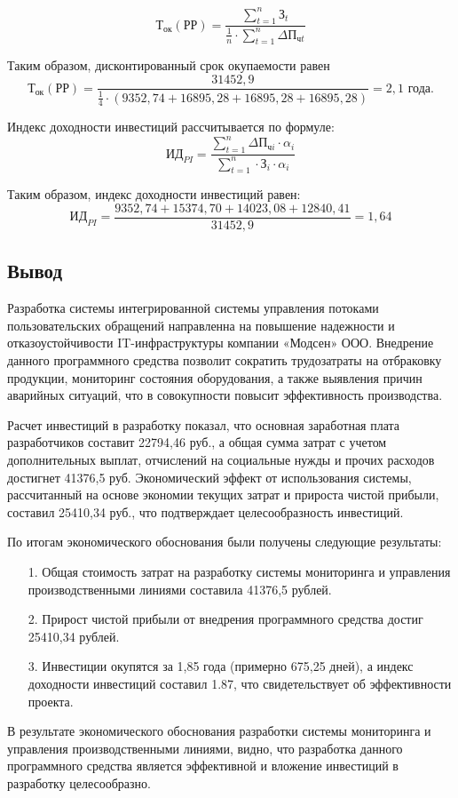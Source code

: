 \begin{equation}
    \text{Т}_\text{ок}(\text{РР})=\frac{\sum_{t=1}^{n}\text{З}_t}{\frac{1}{n}\cdot\sum_{t=1}^{n}\Delta\text{П}_{\text{ч}t}}
\end{equation}

Таким образом, дисконтированный срок окупаемости равен
$$
\text{Т}_\text{ок}(\text{РР})=\frac{31452,9}{\frac{1}{4}\cdot(9352,74+16895,28+16895,28+16895,28)} = 2,1 \text{ года.}
$$

Индекс доходности инвестиций рассчитывается по формуле:
\begin{equation}
    \text{ИД}_{PI}=\frac{\sum_{t=1}^{n}\Delta\text{П}_{\text{ч}i}\cdot \alpha _i}{\sum_{t=1}^{n}\cdot \text{З}_i \cdot \alpha _i}
\end{equation}

Таким образом, индекс доходности инвестиций равен:
$$
\text{ИД}_{PI}=\frac{9352,74+15374,70+14023,08+12840,41}{31452,9} = 1,64
$$

\subsection{Вывод}

Разработка системы интегрированной системы управления потоками
пользовательских обращений направленна на повышение надежности и
отказоустойчивости IT-инфраструктуры компании «Модсен» ООО.
Внедрение данного программного средства позволит сократить трудозатраты
на отбраковку продукции, мониторинг состояния оборудования, а также
выявления причин аварийных ситуаций, что в совокупности повысит
эффективность производства.

Расчет инвестиций в разработку показал, что основная заработная плата
разработчиков составит 22794,46 руб., а общая сумма затрат с учетом дополнительных выплат, отчислений на социальные нужды и прочих расходов достигнет 41376,5 руб. Экономический эффект от использования системы, рассчитанный на основе экономии текущих затрат и прироста чистой прибыли, составил 25410,34 руб., что подтверждает целесообразность инвестиций.

По итогам экономического обоснования были получены следующие результаты:
\begin{enumerate}
\item[1.] Общая стоимость затрат на разработку системы мониторинга и управления производственными линиями составила 41376,5 рублей.
\item[2.] Прирост чистой прибыли от внедрения программного средства достиг 25410,34 рублей.
\item[3.] Инвестиции окупятся за 1,85 года (примерно 675,25 дней), а индекс доходности инвестиций составил 1.87, что свидетельствует об эффективности проекта.
\end{enumerate}

В результате экономического обоснования разработки системы мониторинга и управления производственными линиями, видно, что разработка данного программного средства является эффективной и вложение инвестиций в разработку целесообразно.